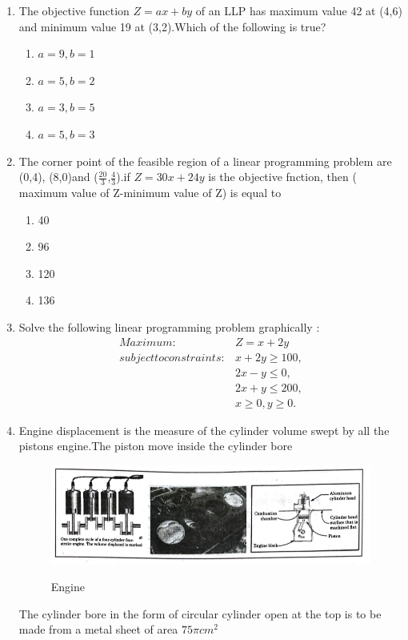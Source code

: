 
\begin{enumerate}
	\item The objective function $Z = ax+by$ of an LLP has maximum value 42 at (4,6) and minimum value 19 at (3,2).Which of the following is true?
		
  		\begin{enumerate}
				\item $a=9,b=1$
		        	\item $a=5,b=2$
				\item $a= 3,b=5$
				\item $a=5,b=3$
			
		\end{enumerate}
		
	\item The corner point of the feasible region of a linear programming problem are (0,4), (8,0)and ($\frac{20}{3}$,$\frac{4}{3}$).if $ Z=30x+24y $ is the objective fnction, then ( maximum value of Z-minimum value of Z) is equal to 
		
		\begin{enumerate}
				\item 40
				\item 96
				\item 120
				\item 136
		\end{enumerate}
		
		
	\item 
	 Solve the following linear programming problem graphically :
\begin{align}
	Maximum:& Z=x+2y \nonumber \\
	subject to constraints 
	     :& x+2y\ge100 ,\nonumber\\
             &  2x-y\le0 ,\nonumber\\
	     &  2x+y\le200 ,\nonumber\\
   	     &   x\ge0 ,y\ge0 .\nonumber
\end{align}
				

			      \item
		Engine displacement is the measure of the cylinder volume swept by all the pistons engine.The piston move inside the cylinder bore \\
		
		\begin{figure}[htbp]
	\includegraphics[width=1 \columnwidth]{./figs/engine.jpg}\\
			\caption{Engine}
			\label{fig:pic}  \end{figure}
		The cylinder bore in the form of circular cylinder open at the top is to be made from a metal sheet of area $ 75 \pi cm^2 $ \\
 	

\end{enumerate}
